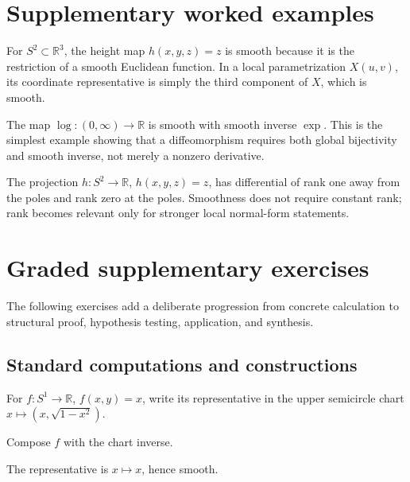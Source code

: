 \section{Supplementary worked examples}
\label{sec:vii03-pedagogy}

\begin{example}\label{ex:vii03-ped-01}
For \(S^2\subset\mathbb R^3\), the height map \(h(x,y,z)=z\) is smooth because it is the restriction of a smooth Euclidean function.  In a local parametrization \(X(u,v)\), its coordinate representative is simply the third component of \(X\), which is smooth.
\end{example}

\begin{example}\label{ex:vii03-ped-02}
The map \(\log:(0,\infty)\to\mathbb R\) is smooth with smooth inverse \(\exp\).  This is the simplest example showing that a diffeomorphism requires both global bijectivity and smooth inverse, not merely a nonzero derivative.
\end{example}

\begin{example}\label{ex:vii03-ped-03}
The projection \(h:S^2\to\mathbb R\), \(h(x,y,z)=z\), has differential of rank one away from the poles and rank zero at the poles.  Smoothness does not require constant rank; rank becomes relevant only for stronger local normal-form statements.
\end{example}

\section{Graded supplementary exercises}
The following exercises add a deliberate progression from concrete calculation to structural proof, hypothesis testing, application, and synthesis.

\subsection*{Standard computations and constructions}

\begin{exercise}\label{exr:vii03-ped-01}
For \(f:S^1\to\mathbb R\), \(f(x,y)=x\), write its representative in the upper semicircle chart \(x\mapsto(x,\sqrt{1-x^2})\).
\end{exercise}
\begin{hint}
Compose \(f\) with the chart inverse.
\end{hint}
\begin{solution}
The representative is \(x\mapsto x\), hence smooth.
\end{solution}

